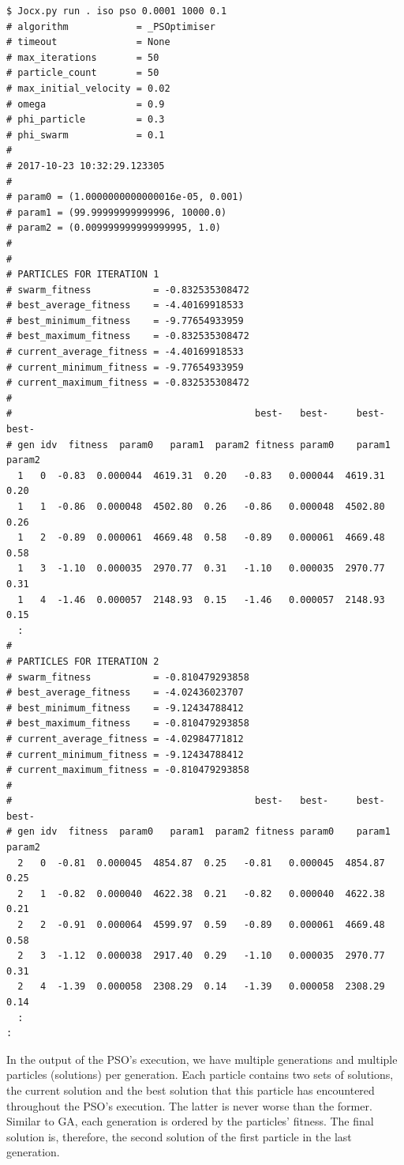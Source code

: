 \documentclass[graybox]{svmult}
\begin{document}
 {\scriptsize{}\begin{verbatim}
$ Jocx.py run . iso pso 0.0001 1000 0.1
# algorithm            = _PSOptimiser
# timeout              = None
# max_iterations       = 50
# particle_count       = 50
# max_initial_velocity = 0.02
# omega                = 0.9
# phi_particle         = 0.3
# phi_swarm            = 0.1
#
# 2017-10-23 10:32:29.123305
#
# param0 = (1.0000000000000016e-05, 0.001)
# param1 = (99.99999999999996, 10000.0)
# param2 = (0.009999999999999995, 1.0)
#
#
# PARTICLES FOR ITERATION 1
# swarm_fitness           = -0.832535308472
# best_average_fitness    = -4.40169918533
# best_minimum_fitness    = -9.77654933959
# best_maximum_fitness    = -0.832535308472
# current_average_fitness = -4.40169918533
# current_minimum_fitness = -9.77654933959
# current_maximum_fitness = -0.832535308472
#
#                                           best-   best-     best-     best-
# gen idv  fitness  param0   param1  param2 fitness param0    param1    param2
  1   0  -0.83  0.000044  4619.31  0.20   -0.83   0.000044  4619.31   0.20
  1   1  -0.86  0.000048  4502.80  0.26   -0.86   0.000048  4502.80   0.26
  1   2  -0.89  0.000061  4669.48  0.58   -0.89   0.000061  4669.48   0.58
  1   3  -1.10  0.000035  2970.77  0.31   -1.10   0.000035  2970.77   0.31
  1   4  -1.46  0.000057  2148.93  0.15   -1.46   0.000057  2148.93   0.15
  :
#
# PARTICLES FOR ITERATION 2
# swarm_fitness           = -0.810479293858
# best_average_fitness    = -4.02436023707
# best_minimum_fitness    = -9.12434788412
# best_maximum_fitness    = -0.810479293858
# current_average_fitness = -4.02984771812
# current_minimum_fitness = -9.12434788412
# current_maximum_fitness = -0.810479293858
#
#                                           best-   best-     best-     best-
# gen idv  fitness  param0   param1  param2 fitness param0    param1    param2
  2   0  -0.81  0.000045  4854.87  0.25   -0.81   0.000045  4854.87   0.25
  2   1  -0.82  0.000040  4622.38  0.21   -0.82   0.000040  4622.38   0.21
  2   2  -0.91  0.000064  4599.97  0.59   -0.89   0.000061  4669.48   0.58
  2   3  -1.12  0.000038  2917.40  0.29   -1.10   0.000035  2970.77   0.31
  2   4  -1.39  0.000058  2308.29  0.14   -1.39   0.000058  2308.29   0.14
  :
:
\end{verbatim}}

In the output of the PSO's execution, we have multiple generations and multiple particles (solutions) per generation. Each particle contains two sets of solutions, the current solution and the best solution that this particle has encountered throughout the PSO's execution. The latter is never worse than the former. Similar to GA, each generation is ordered by the particles' fitness. The final solution is, therefore, the second solution of the first particle in the last generation.
\end{document}
